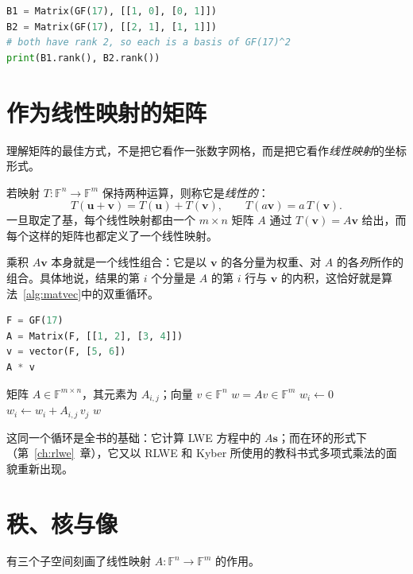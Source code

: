 \begin{lstlisting}[language=Python]
B1 = Matrix(GF(17), [[1, 0], [0, 1]])
B2 = Matrix(GF(17), [[2, 1], [1, 1]])
# both have rank 2, so each is a basis of GF(17)^2
print(B1.rank(), B2.rank())
\end{lstlisting}

\section{作为线性映射的矩阵}
理解矩阵的最佳方式，不是把它看作一张数字网格，而是把它看作\emph{线性映射}的坐标形式。

\begin{definition}[线性映射]
若映射 $T\colon \mathbb{F}^n \to \mathbb{F}^m$ 保持两种运算，则称它是\emph{线性的}：
\[
T(\mathbf{u}+\mathbf{v}) = T(\mathbf{u})+T(\mathbf{v}),\qquad T(a\mathbf{v}) = a\,T(\mathbf{v}).
\]
一旦取定了基，每个线性映射都由一个 $m\times n$ 矩阵 $A$ 通过 $T(\mathbf{v})=A\mathbf{v}$ 给出，而每个这样的矩阵也都定义了一个线性映射。
\end{definition}

乘积 $A\mathbf{v}$ 本身就是一个线性组合：它是以 $\mathbf{v}$ 的各分量为权重、对 $A$ 的各\emph{列}所作的组合。具体地说，结果的第 $i$ 个分量是 $A$ 的第 $i$ 行与 $\mathbf{v}$ 的内积，这恰好就是算法~\ref{alg:matvec}中的双重循环。

\begin{lstlisting}[language=Python]
F = GF(17)
A = Matrix(F, [[1, 2], [3, 4]])
v = vector(F, [5, 6])
A * v
\end{lstlisting}

\begin{algorithm}[H]
\caption{矩阵--向量乘积}
\label{alg:matvec}
\begin{algorithmic}[1]
\Require 矩阵 $A \in \mathbb{F}^{m\times n}$，其元素为 $A_{i,j}$；向量 $v \in \mathbb{F}^n$
\Ensure $w = Av \in \mathbb{F}^m$
    \State $w_i \gets 0$
        \State $w_i \gets w_i + A_{i,j}\, v_j$
    \EndFor
\EndFor
\State \Return $w$
\end{algorithmic}
\end{algorithm}

这同一个循环是全书的基础：它计算 LWE 方程中的 $A\mathbf{s}$；而在环的形式下（第~\ref{ch:rlwe}~章），它又以 RLWE 和 Kyber 所使用的教科书式多项式乘法的面貌重新出现。

\section{秩、核与像}
有三个子空间刻画了线性映射 $A\colon\mathbb{F}^n\to\mathbb{F}^m$ 的作用。

